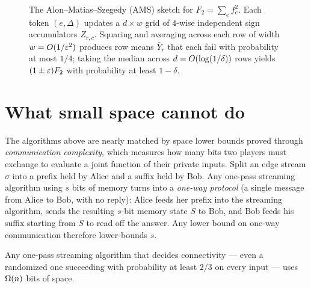 \begin{figure}[htbp]
\caption{The Alon--Matias--Szegedy (AMS) sketch for $F_2 = \sum_e f_e^2$. Each token $(e,\Delta)$ updates a $d\times w$ grid of $4$-wise independent sign accumulators $Z_{r,c}$. Squaring and averaging across each row of width $w=O(1/\varepsilon^2)$ produces row means $\bar Y_r$ that each fail with probability at most $1/4$; taking the median across $d=O(\log(1/\delta))$ rows yields $(1\pm\varepsilon)F_2$ with probability at least $1-\delta$.}
\label{ch40:fig-ams-sketch}
\end{figure}

\section{What small space cannot do}
\label{ch40:lower}

The algorithms above are nearly matched by space lower bounds proved through
\emph{communication complexity}, which measures how many bits two players must
exchange to evaluate a joint function of their private inputs. Split an edge
stream $\sigma$ into a prefix held by Alice and a suffix held by Bob. Any
one-pass streaming algorithm using $s$ bits of memory turns into a
\emph{one-way protocol} (a single message from Alice to Bob, with no reply):
Alice feeds her prefix into the streaming algorithm, sends the resulting $s$-bit
memory state $S$ to Bob, and Bob feeds his suffix starting from $S$ to read off
the answer. Any lower bound on one-way communication therefore lower-bounds $s$.

\begin{theorem}\label{ch40:thm-lb-conn}
Any one-pass streaming algorithm that decides connectivity --- even a randomized
one succeeding with probability at least $2/3$ on every input --- uses $\Omega(n)$
bits of space.
\end{theorem}


